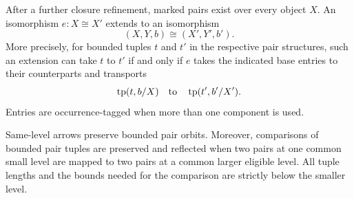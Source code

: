 \begin{lemma}
\label{mark:pair-isomorphism}
After a further closure refinement, marked pairs exist over every
object \(X\).  An isomorphism \(e:X\cong X'\) extends to an isomorphism
\[
                 (X,Y,b)\cong(X',Y',b').
\]
More precisely, for bounded tuples \(t\) and \(t'\) in the respective
pair structures, such an extension can take \(t\) to \(t'\) if and only
if \(e\) takes the indicated base entries to their counterparts and
transports
\[
                    \operatorname{tp}(t,b/X)
             \quad\hbox{to}\quad
                    \operatorname{tp}(t',b'/X').
\]
Entries are occurrence-tagged when more than one component is used.

Same-level arrows preserve bounded pair orbits.  Moreover, comparisons
of bounded pair tuples are preserved and reflected when two pairs
at one common small level are mapped to two pairs at a common
larger eligible level.
All tuple lengths and the bounds needed for the comparison are
strictly below the smaller level.
\end{lemma}

